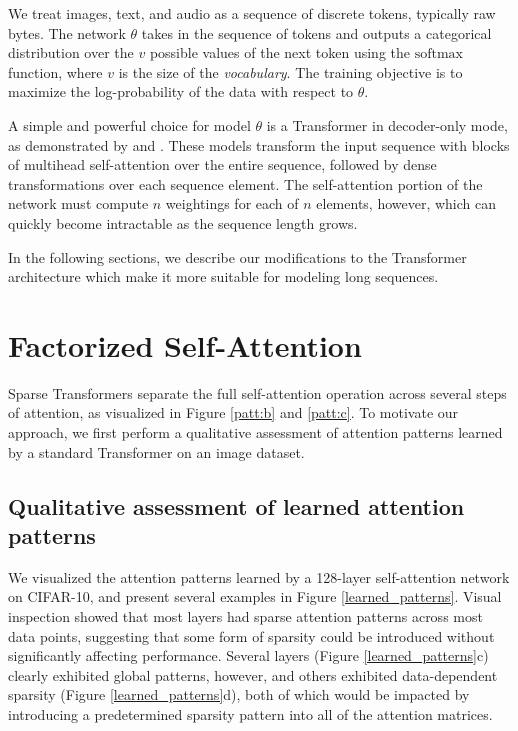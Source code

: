 \documentclass{article}
\begin{document}
We treat images, text, and audio as a sequence of discrete tokens, typically raw bytes. The network $\theta$ takes in the sequence of tokens and outputs a categorical distribution over the $v$ possible values of the next token using the $\mathrm{softmax}$ function, where $v$ is the size of the \textit{vocabulary}. The training objective is to maximize the log-probability of the data with respect to $\theta$.

A simple and powerful choice for model $\theta$ is a Transformer \cite{vaswani2017attention} in decoder-only mode, as demonstrated by \cite{radford2018} and \cite{liu2018generating}. These models transform the input sequence with blocks of multihead self-attention over the entire sequence, followed by dense transformations over each sequence element. The self-attention portion of the network must compute $n$ weightings for each of $n$ elements, however, which can quickly become intractable as the sequence length grows.

In the following sections, we describe our modifications to the Transformer architecture which make it more suitable for modeling long sequences.

\section{Factorized Self-Attention}

Sparse Transformers separate the full self-attention operation across several steps of attention, as visualized in Figure \ref{patt:b} and \ref{patt:c}. To motivate our approach, we first perform a qualitative assessment of attention patterns learned by a standard Transformer on an image dataset.

\subsection{Qualitative assessment of learned attention patterns}
We visualized the attention patterns learned by a 128-layer self-attention network on CIFAR-10, and present several examples in Figure \ref{learned_patterns}. Visual inspection showed that most layers had sparse attention patterns across most data points, suggesting that some form of sparsity could be introduced without significantly affecting performance. Several layers (Figure \ref{learned_patterns}c) clearly exhibited global patterns, however, and others exhibited data-dependent sparsity (Figure \ref{learned_patterns}d), both of which would be impacted by introducing a predetermined sparsity pattern into all of the attention matrices.
\end{document}
